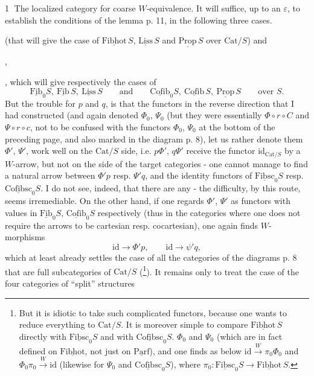 \documentclass[11pt]{article}
\newcommand{\printedpage}[1]{\marginpar{\footnotesize p.~#1}}
\newcommand{\msp}[1]{\marginpar{\footnotesize [#1]}}
\newcommand{\uc}[1]{\underline{\mathrm{#1}}}
\newcommand{\Cat}{\mathrm{Cat}}
\begin{document}
\textcircled{1} The localized category for coarse $W$-equivalence. It will suffice, up to an $\varepsilon$, to establish the conditions of the lemma p. 11, in the following three cases.
(that will give the case of $\uc{Fibhot}\,S$, $\uc{Liss}\,S$ and $\uc{Prop}\,S$ over $\Cat/S$) and
,
,
which will give respectively the cases of
\[
\uc{Fib}_0S,\ \uc{Fib}\,S,\ \uc{Liss}\,S \qquad \text{and} \qquad \uc{Cofib}_0S,\ \uc{Cofib}\,S,\ \uc{Prop}\,S \qquad \text{over } S.
\]
But the trouble for $p$ and $q$, is that the functors in the reverse direction that I had constructed (and again denoted $\Phi_0$, $\Psi_0$ (but they were essentially $\Phi\circ r\circ C$ and $\Psi\circ r\circ c$, not to be confused with the functors $\Phi_0$, $\Psi_0$ at the bottom of the preceding page, and also marked in the diagram p. 8), let us rather denote them $\Phi'$, $\Psi'$, work well on the $\Cat/S$ side, i.e. $p\Phi'$, $q\Psi'$ receive the functor $\mathrm{id}_{\Cat/S}$ by a $W$-arrow, but not on the side of the target categories - one cannot manage to find a natural arrow between $\Phi'p$ resp. $\Psi'q$, and the identity functors of $\uc{Fibsc}_0S$ resp. $\uc{Cofibsc}_0S$. I do
\msp{page 53}
not see, indeed, that there are any - the difficulty, by this route, seems irremediable. On the other hand, if one regards $\Phi'$, $\Psi'$ as functors with values in $\uc{Fib}_0S$, $\uc{Cofib}_0S$ respectively (thus in the categories where one does not require the arrows to be cartesian resp. cocartesian), one again finds $W$-morphisms %
\[
\mathrm{id} \longrightarrow \Phi'p, \qquad \mathrm{id} \longrightarrow \psi'q, %
\]
which at least already settles the case of all the categories of the diagrams p. 8 that are
\printedpage{33}
full subcategories of $\Cat/S$ (\footnote[36]{But it is idiotic to take such complicated functors, because one wants to reduce everything to $\Cat/S$. It is moreover simple to compare $\uc{Fibhot}\,S$ directly with $\uc{Fibsc}_0S$ and with $\uc{Cofibsc}_0S$. $\Phi_0$ and $\Psi_0$ (which are in fact defined on $\uc{Fibhot}$, not just on $\uc{Parf}$), and one finds as below $\mathrm{id} \xrightarrow{W} \pi_0\Phi_0$ and $\Phi_0\pi_0 \xrightarrow{W} \mathrm{id}$ (likewise for $\Psi_0$ and $\uc{Cofibsc}_0S$), where $\pi_0 : \uc{Fibsc}_0S \longrightarrow \uc{Fibhot}\,S$.}). It remains only to treat the case of the four categories of ``split'' structures
\end{document}
